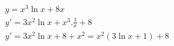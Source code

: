 \begin{ex}
\begin{align}
&y=x^3\ln{x}+8x\nonumber\\
&y'=3x^2\ln{x}+x^3.\frac{1}{x}+8\nonumber\\
&y'=3x^2\ln{x}+8+x^2=x^2(3\ln{x}+1)+8\nonumber
\end{align}
\end{ex}